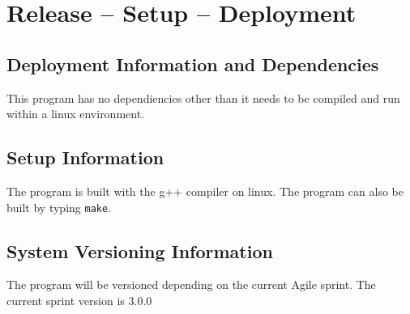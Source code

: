 
\chapter{Release -- Setup -- Deployment}


\section{Deployment Information and Dependencies}
This program has no dependiencies other than it needs to be compiled and run within a linux environment. 



\section{Setup Information}
The program is built with the g++ compiler on linux. The program can also be built by typing {\tt make}.



\section{System  Versioning Information}
The program will be versioned depending on the current Agile sprint. The current sprint version is 3.0.0
